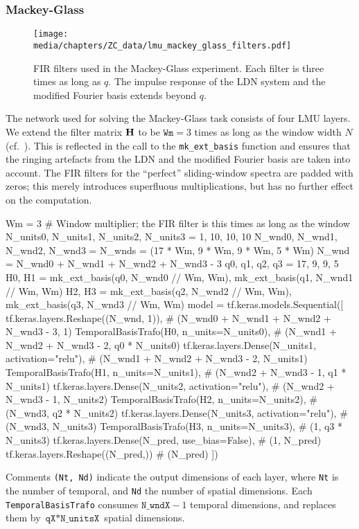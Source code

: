 \subsubsection{Mackey-Glass}

\begin{figure}
	\texttt{[image: media/chapters/ZC\_data/lmu\_mackey\_glass\_filters.pdf]}
	\caption[FIR filters used in the Mackey-Glass experiment]{FIR filters used in the Mackey-Glass experiment. Each filter is three times as long as $q$. The impulse response of the LDN system and the modified Fourier basis extends beyond $q$.}
	\label{fig:lmu_mackey_glass_filters}
\end{figure}

The network used for solving the Mackey-Glass task consists of four LMU layers.
We extend the filter matrix $\mathbf{H}$ to be $\texttt{Wm} = 3$ times as long as the window width $N$ (cf.~).
This is reflected in the call to the \texttt{mk\_ext\_basis} function and ensures that the ringing artefacts from the LDN and the modified Fourier basis are taken into account.
The FIR filters for the \enquote{perfect} sliding-window spectra are padded with zeros; this merely introduces superfluous multiplications, but has no further effect on the computation.
\begin{pythoncode}
Wm = 3 # Window multiplier; the FIR filter is this times as long as the window
N_units0, N_units1, N_units2, N_units3 = 1, 10, 10, 10
N_wnd0, N_wnd1, N_wnd2, N_wnd3 = N_wnds = (17 * Wm, 9 * Wm, 9 * Wm, 5 * Wm)
N_wnd = N_wnd0 + N_wnd1 + N_wnd2 + N_wnd3 - 3
q0, q1, q2, q3 = 17, 9, 9, 5
H0, H1 = mk_ext_basis(q0, N_wnd0 // Wm, Wm), mk_ext_basis(q1, N_wnd1 // Wm, Wm)
H2, H3 = mk_ext_basis(q2, N_wnd2 // Wm, Wm), mk_ext_basis(q3, N_wnd3 // Wm, Wm)
model = tf.keras.models.Sequential([
  tf.keras.layers.Reshape((N_wnd, 1)),
  # (N_wnd0 + N_wnd1 + N_wnd2 + N_wnd3 - 3, 1)
  TemporalBasisTrafo(H0, n_units=N_units0),
  # (N_wnd1 + N_wnd2 + N_wnd3 - 2, q0 * N_units0)
  tf.keras.layers.Dense(N_units1, activation="relu"),
  # (N_wnd1 + N_wnd2 + N_wnd3 - 2, N_units1)
  TemporalBasisTrafo(H1, n_units=N_units1),
  # (N_wnd2 + N_wnd3 - 1, q1 * N_units1)
  tf.keras.layers.Dense(N_units2, activation="relu"),
  # (N_wnd2 + N_wnd3 - 1, N_units2)
  TemporalBasisTrafo(H2, n_units=N_units2),
  # (N_wnd3, q2 * N_units2)
  tf.keras.layers.Dense(N_units3, activation="relu"),
  # (N_wnd3, N_units3)
  TemporalBasisTrafo(H3, n_units=N_units3),
  # (1, q3 * N_units3)
  tf.keras.layers.Dense(N_pred, use_bias=False), # (1, N_pred)
  tf.keras.layers.Reshape((N_pred,)) # (N_pred)
])
\end{pythoncode}
Comments \texttt{(Nt, Nd)} indicate the output dimensions of each layer, where \texttt{Nt} is the number of temporal, and \texttt{Nd} the number of spatial dimensions.
Each \texttt{TemporalBasisTrafo} consumes $\texttt{N\_wndX} - 1$ temporal dimensions, and replaces them by $\texttt{qX} * \texttt{N\_unitsX}$ spatial dimensions.

